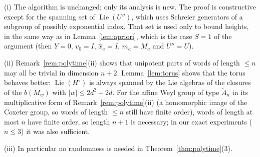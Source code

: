 \begin{remark}\label{rem:detpoly}
(i) The algorithm is unchanged; only its analysis is new. The proof is constructive except for the spanning set
of $\operatorname{Lie}(U'')$, which uses Schreier generators of a subgroup of possibly exponential index. That set is used
only to bound heights, in the same way as in Lemma~\ref{lem:apriori}, which is the case $S=1$ of the argument
(then $Y=0$, $v_0=I$, $\hat x_a=I$, $m_a=M_a$ and $U''=U$).

(ii) Remark~\ref{rem:polytime}(ii) shows that unipotent parts of words of length $\le n$ may all be trivial in
dimension $n+2$. Lemma~\ref{lem:torus} shows that the torus behaves better: $\operatorname{Lie}(H^\circ)$ is always spanned by
the Lie algebras of the closures of the $b(M_w)$ with $|w|\le2d^2+2d$. For the affine Weyl group of type
$\tilde A_n$ in its multiplicative form of Remark~\ref{rem:polytime}(ii) (a homomorphic image of the Coxeter
group, so words of length $\le n$ still have finite order), words of length at most $n$ have
finite order, so length $n+1$ is necessary; in our exact experiments ($n\le3$) it was also sufficient.

(iii) In particular no randomness is needed in Theorem~\ref{thm:polytime}(3).
\end{remark}
